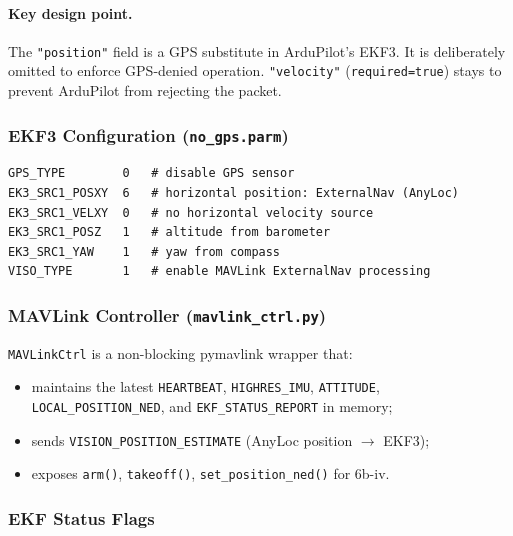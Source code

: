 \documentclass[11pt,a4paper]{article}
\begin{document}
\paragraph{Key design point.} The \texttt{"position"} field is a GPS substitute in
ArduPilot's EKF3.  It is deliberately omitted to enforce GPS-denied operation.
\texttt{"velocity"} (\texttt{required=true}) stays to prevent ArduPilot from rejecting the
packet.

\subsubsection*{EKF3 Configuration (\texttt{no\_gps.parm})}

\begin{lstlisting}[caption={SITL parameter file for GPS-denied operation}]
GPS_TYPE        0   # disable GPS sensor
EK3_SRC1_POSXY  6   # horizontal position: ExternalNav (AnyLoc)
EK3_SRC1_VELXY  0   # no horizontal velocity source
EK3_SRC1_POSZ   1   # altitude from barometer
EK3_SRC1_YAW    1   # yaw from compass
VISO_TYPE       1   # enable MAVLink ExternalNav processing
\end{lstlisting}

\subsubsection*{MAVLink Controller (\texttt{mavlink\_ctrl.py})}

\texttt{MAVLinkCtrl} is a non-blocking pymavlink wrapper that:
\begin{itemize}
  \item maintains the latest \texttt{HEARTBEAT}, \texttt{HIGHRES\_IMU}, \texttt{ATTITUDE},
        \texttt{LOCAL\_POSITION\_NED}, and \texttt{EKF\_STATUS\_REPORT} in memory;
  \item sends \texttt{VISION\_POSITION\_ESTIMATE} (AnyLoc position \ensuremath{\to} EKF3);
  \item exposes \texttt{arm()}, \texttt{takeoff()}, \texttt{set\_position\_ned()} for 6b-iv.
\end{itemize}

\subsubsection*{EKF Status Flags}
\end{document}
